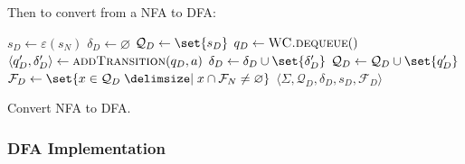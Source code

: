 \begin{definition}
    Then to convert from a NFA to DFA:
    \begin{algorithm}[H]
        \begin{algorithmic}[1]
                \State $s_D \gets \varepsilon(s_N)$
                \State $\delta_D \gets \varnothing$
                \State $\mathcal{Q}_D \gets \set{s_D}$
                \State {} 
                    \State $q_D \gets \Call{WC.dequeue}{\null}$
                        \State $\langle q_D^\prime, \delta_D^\prime \rangle \gets \Call{addTransition}{q_D, a}$
                        \State $\delta_D \gets \delta_D \cup \set{\delta_D^\prime}$
                            \State {}
                        \EndIf
                        \State $\mathcal{Q}_D \gets \mathcal{Q}_D \cup \set{q_D^\prime}$
                    \EndFor
                \EndWhile
                \State $\mathcal{F}_D \gets \set{x \in \mathcal{Q}_D \given x \cap \mathcal{F}_N \ne \varnothing}$
                \State \Return $\langle
                    \Sigma,
                    \mathcal{Q}_D,
                    \delta_D,
                    s_D,
                    \mathcal{F}_D
                \rangle$
            \EndProcedure
        \end{algorithmic}
        \caption{Convert NFA to DFA.}
        \label{algo:nfa-to-dfa}
    \end{algorithm}
\end{definition}


\subsubsection{DFA Implementation}


